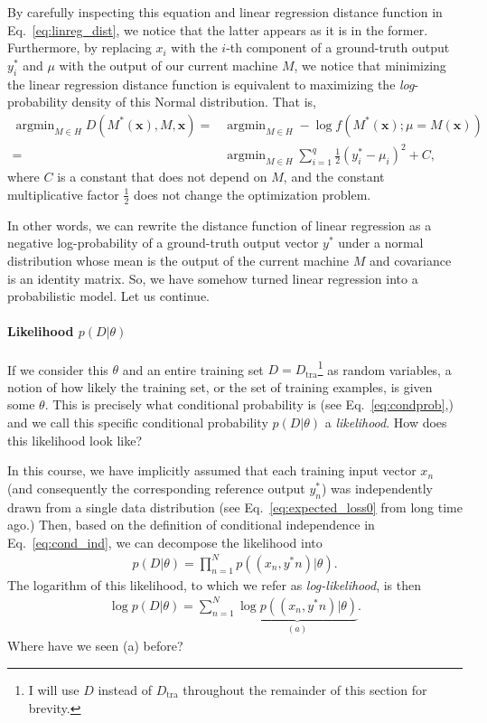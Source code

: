 \documentclass{report}
\newcommand{\vect}[1]{\mathbf{#1}}
\newcommand{\vx}[0]{\vect{x}}
\DeclareMathOperator*{\argmin}{\arg \min}
\newcommand{\tra}{\text{tra}}
\begin{document}
By carefully inspecting this equation and linear regression distance function in
Eq.~\eqref{eq:linreg_dist}, we notice that the latter appears as it is in the
former. Furthermore, by replacing $x_i$ with the $i$-th component of a
ground-truth output $y^*_i$ and $\mu$ with the output of our current machine
$M$, we notice that minimizing the linear regression distance function is
equivalent to maximizing the {\it log}-probability density of this Normal
distribution. That is,
\begin{align}
    \label{eq:linreg_nll}
    \argmin_{M \in H} D(M^*(\vx), M, \vx) =&
    \argmin_{M \in H} -\log f(M^*(\vx); \mu=M(\vx)) \\
    =&\argmin_{M \in H} \sum_{i=1}^q \frac{1}{2} (y^*_i - \mu_i)^2 + C,
\end{align}
where $C$ is a constant that does not depend on $M$, and the constant
multiplicative factor $\frac{1}{2}$ does not change the optimization problem.

In other words, we can rewrite the distance function of linear regression as a
negative log-probability of a ground-truth output vector $y^*$ under a normal
distribution whose mean is the output of the current machine $M$ and covariance
is an identity matrix. So, we have somehow turned linear regression into a
probabilistic model. Let us continue.


\paragraph{Likelihood $p(D|\theta)$}

If we consider this $\theta$ and an entire training set $D=D_{\tra}$\footnote{
    I will use $D$ instead of $D_{\tra}$ throughout the remainder of this
    section for brevity.
} as random variables, a notion of how likely the training set, or the set of
training examples, is given some $\theta$. This is precisely what conditional
probability is (see Eq.~\eqref{eq:condprob},) and we call this specific
conditional probability $p(D|\theta)$ a {\it likelihood}. How does this
likelihood look like?

In this course, we have implicitly assumed that each training input vector $x_n$
(and consequently the corresponding reference output $y_n^*$) was independently
drawn from a single data distribution (see Eq.~\eqref{eq:expected_loss0} from
long time ago.) Then, based on the definition of conditional independence in
Eq.~\eqref{eq:cond_ind}, we can decompose the likelihood into
\begin{align*}
    p(D|\theta) = \prod_{n=1}^N p((x_n, y^*n)|\theta).
\end{align*}
The logarithm of this likelihood, to which we refer as {\it log-likelihood}, is
then 
\begin{align*}
    \log p(D|\theta) = \sum_{n=1}^N \underbrace{\log p((x_n,
    y^*n)|\theta)}_{(a)}.
\end{align*}
Where have we seen (a) before? 
\end{document}
